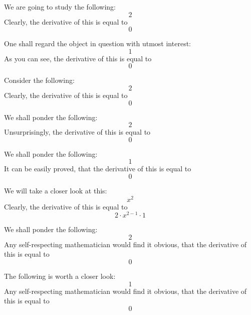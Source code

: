 \documentclass{article}
\begin{document}
We are going to study the following:
\begin{equation}
2 
\end{equation}
Clearly, the derivative of this is equal to
\begin{equation}
0 
\end{equation}

One shall regard the object in question with utmost interest:
\begin{equation}
1 
\end{equation}
As you can see, the derivative of this is equal to
\begin{equation}
0 
\end{equation}

Consider the following:
\begin{equation}
2 
\end{equation}
Clearly, the derivative of this is equal to
\begin{equation}
0 
\end{equation}

We shall ponder the following:
\begin{equation}
2 
\end{equation}
Unsurprisingly, the derivative of this is equal to
\begin{equation}
0 
\end{equation}

We shall ponder the following:
\begin{equation}
1 
\end{equation}
It can be easily proved, that the derivative of this is equal to
\begin{equation}
0 
\end{equation}

We will take a closer look at this:
\begin{equation}
x ^{2 } 
\end{equation}
Clearly, the derivative of this is equal to
\begin{equation}
2 \cdot x ^{2 - 1 } \cdot 1 
\end{equation}

We shall ponder the following:
\begin{equation}
2 
\end{equation}
Any self-respecting mathematician would find it obvious, that the derivative of this is equal to
\begin{equation}
0 
\end{equation}

The following is worth a closer look:
\begin{equation}
1 
\end{equation}
Any self-respecting mathematician would find it obvious, that the derivative of this is equal to
\begin{equation}
0 
\end{equation}
\end{document}

